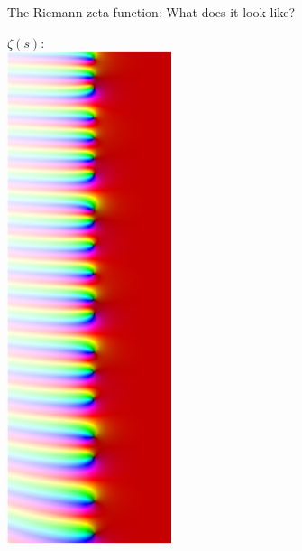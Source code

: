 \documentclass{beamer}
\begin{document}
\begin{frame}{The Riemann zeta function: What does it look like?}
\begin{center}
$\zeta(s)$:\\[0.7em]\includegraphics[angle=90,width=\textwidth]{img/zeroes}
\end{center}
\end{frame}
\end{document}
